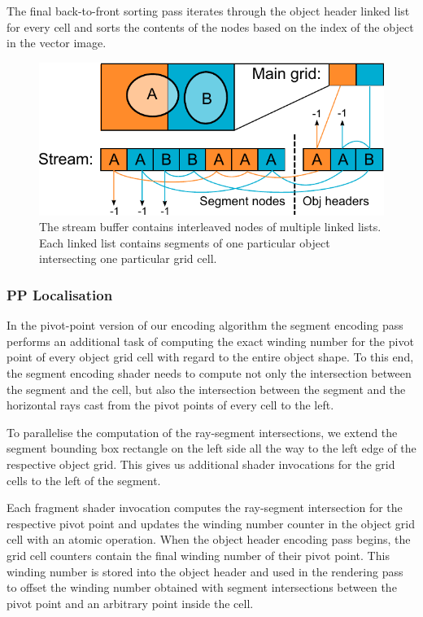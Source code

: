\documentclass[11pt,a4paper,twoside]{article}
\begin{document}
The final back-to-front sorting pass iterates through the object header linked list for every cell and sorts the contents of the nodes based on the index of the object in the vector image.

\begin {figure} 
	\centering
	\includegraphics[width=0.6\columnwidth] {figures/obj_stream}
	\caption {The stream buffer contains interleaved nodes of multiple linked lists. Each linked list contains segments of one particular object intersecting one particular grid cell.}
	\label {fig:obj_stream}
\end {figure}

\subsubsection {PP Localisation}

In the pivot-point version of our encoding algorithm the segment encoding pass performs an additional task of computing the exact winding number for the pivot point of every object grid cell with regard to the entire object shape. To this end, the segment encoding shader needs to compute not only the intersection between the segment and the cell, but also the intersection between the segment and the horizontal rays cast from the pivot points of every cell to the left.

To parallelise the computation of the ray-segment intersections, we extend the segment bounding box rectangle on the left side all the way to the left edge of the respective object grid. This gives us additional shader invocations for the grid cells to the left of the segment.

Each fragment shader invocation computes the ray-segment intersection for the respective pivot point and updates the winding number counter in the object grid cell with an atomic operation. When the object header encoding pass begins, the grid cell counters contain the final winding number of their pivot point. This winding number is stored into the object header and used in the rendering pass to offset the winding number obtained with segment intersections between the pivot point and an arbitrary point inside the cell.
\end{document}
